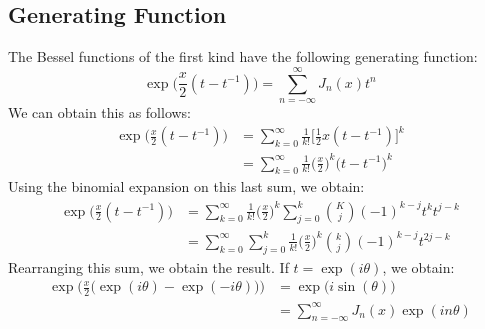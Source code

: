         \subsection{Generating Function}
            The Bessel functions of the first kind have the
            following generating function:
            \begin{equation}
                \exp\Big(\frac{x}{2}(t-t^{\minus{1}})\Big)
                =\sum_{n=\minus\infty}^{\infty}
                    J_{n}(x)t^{n}
            \end{equation}
            We can obtain this as follows:
            \begin{subequations}
                \begin{align}
                    \exp\Big(\frac{x}{2}(t-t^{\minus{1}})\Big)
                    &=\sum_{k=0}^{\infty}\frac{1}{k!}
                    \Big[\frac{1}{2}x(t-t^{\minus{1}})\Big]^{k}\\
                    &=\sum_{k=0}^{\infty}\frac{1}{k!}
                        \Big(\frac{x}{2}\Big)^{k}
                        \Big(t-t^{\minus{1}}\Big)^{k}
                \end{align}
            \end{subequations}
            Using the binomial expansion on this last sum, we
            obtain:
            \begin{subequations}
                \begin{align}
                    \exp\Big(\frac{x}{2}(t-t^{\minus{1}})\Big)
                    &=\sum_{k=0}^{\infty}\frac{1}{k!}
                        \Big(\frac{x}{2}\Big)^{k}
                        \sum_{j=0}^{k}\binom{K}{j}
                        (\minus{1})^{k-j}t^{k}t^{j-k}\\
                    &=\sum_{k=0}^{\infty}\sum_{j=0}^{k}
                        \frac{1}{k!}\Big(\frac{x}{2}\Big)^{k}
                        \binom{k}{j}(\minus{1})^{k-j}t^{2j-k}
                \end{align}
            \end{subequations}
            Rearranging this sum, we obtain the result. If
            $t=\exp(i\theta)$, we obtain:
            \begin{align}
                \exp\Big(\frac{x}{2}\big(
                    \exp(i\theta)-\exp(\minus{i}\theta)\big)\Big)
                &=\exp\big(i\sin(\theta)\big)\\
                &=\sum_{n=\minus\infty}^{\infty}
                    J_{n}(x)\exp(in\theta)
            \end{align}
